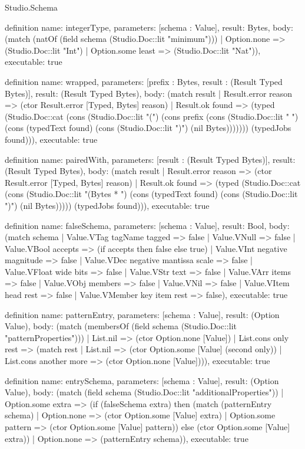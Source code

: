 \begin{lexlean}{Studio.Schema}
\begin{semanticmodule}
definition{
  name: integerType,
  parameters: [schema : Value],
  result: Bytes,
  body: (match (natOf (field schema (Studio.Doc::lit "minimum")))
    | Option.none => (Studio.Doc::lit "Int")
    | Option.some least => (Studio.Doc::lit "Nat")),
  executable: true
}

definition{
  name: wrapped,
  parameters: [prefix : Bytes, result : (Result Typed Bytes)],
  result: (Result Typed Bytes),
  body: (match result
    | Result.error reason => (ctor Result.error [Typed, Bytes] reason)
    | Result.ok found => (typed (Studio.Doc::cat (cons (Studio.Doc::lit "(") (cons prefix (cons (Studio.Doc::lit " ") (cons (typedText found) (cons (Studio.Doc::lit ")") (nil Bytes))))))) (typedJobs found))),
  executable: true
}

definition{
  name: pairedWith,
  parameters: [result : (Result Typed Bytes)],
  result: (Result Typed Bytes),
  body: (match result
    | Result.error reason => (ctor Result.error [Typed, Bytes] reason)
    | Result.ok found => (typed (Studio.Doc::cat (cons (Studio.Doc::lit "(Bytes * ") (cons (typedText found) (cons (Studio.Doc::lit ")") (nil Bytes))))) (typedJobs found))),
  executable: true
}

definition{
  name: falseSchema,
  parameters: [schema : Value],
  result: Bool,
  body: (match schema
    | Value.VTag tagName tagged => false
    | Value.VNull => false
    | Value.VBool accepts => (if accepts then false else true)
    | Value.VInt negative magnitude => false
    | Value.VDec negative mantissa scale => false
    | Value.VFloat wide bits => false
    | Value.VStr text => false
    | Value.VArr items => false
    | Value.VObj members => false
    | Value.VNil => false
    | Value.VItem head rest => false
    | Value.VMember key item rest => false),
  executable: true
}

definition{
  name: patternEntry,
  parameters: [schema : Value],
  result: (Option Value),
  body: (match (membersOf (field schema (Studio.Doc::lit "patternProperties")))
    | List.nil => (ctor Option.none [Value])
    | List.cons only rest => (match rest
      | List.nil => (ctor Option.some [Value] (second only))
      | List.cons another more => (ctor Option.none [Value]))),
  executable: true
}

definition{
  name: entrySchema,
  parameters: [schema : Value],
  result: (Option Value),
  body: (match (field schema (Studio.Doc::lit "additionalProperties"))
    | Option.some extra => (if (falseSchema extra) then (match (patternEntry schema)
      | Option.none => (ctor Option.some [Value] extra)
      | Option.some pattern => (ctor Option.some [Value] pattern)) else (ctor Option.some [Value] extra))
    | Option.none => (patternEntry schema)),
  executable: true
}


\end{semanticmodule}
\end{lexlean}

